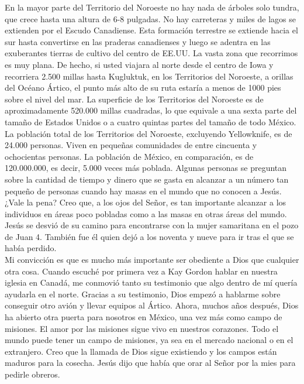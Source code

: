 \documentclass[twoside, 12pt]{book}
\begin{document}
En la mayor parte del Territorio del Noroeste no hay nada de árboles solo tundra, que crece hasta una altura de 6-8 pulgadas. No hay carreteras y miles de lagos se extienden por el Escudo Canadiense. Esta formación terrestre se extiende hacia el sur hasta convertirse en las praderas canadienses y luego se adentra en las exuberantes tierras de cultivo del centro de EE.UU. La vasta zona que recorrimos es muy plana. De hecho, si usted viajara al norte desde el centro de Iowa y recorriera 2.500 millas hasta Kugluktuk, en los Territorios del Noroeste, a orillas del Océano Ártico, el punto más alto de su ruta estaría a menos de 1000 pies sobre el nivel del mar. La superficie de los Territorios del Noroeste es de aproximadamente 520.000 millas cuadradas, lo que equivale a una sexta parte del tamaño de Estados Unidos o a cuatro quintas partes del tamaño de todo México. La población total de los Territorios del Noroeste, excluyendo Yellowknife, es de 24.000 personas. Viven en pequeñas comunidades de entre cincuenta y ochocientas personas. La población de México, en comparación, es de 120.000.000, es decir, 5.000 veces más poblada. Algunas personas se preguntan sobre la cantidad de tiempo y dinero que se gasta en alcanzar a un número tan pequeño de personas cuando hay masas en el mundo que no conocen a Jesús. ¿Vale la pena? Creo que, a los ojos del Señor, es tan importante alcanzar a los individuos en áreas poco pobladas como a las masas en otras áreas del mundo. Jesús se desvió de su camino para encontrarse con la mujer samaritana en el pozo de Juan 4. También fue él quien dejó a los noventa y nueve para ir tras el que se había perdido.\\

Mi convicción es que es mucho más importante ser obediente a Dios que cualquier otra cosa. Cuando escuché por primera vez a Kay Gordon hablar en nuestra iglesia en Canadá, me conmovió tanto su testimonio que algo dentro de mí quería ayudarla en el norte. Gracias a su testimonio, Dios empezó a hablarme sobre conseguir otro avión y llevar equipos al Ártico. Ahora, muchos años después, Dios ha abierto otra puerta para nosotros en México, una vez más como campo de misiones. El amor por las misiones sigue vivo en nuestros corazones. Todo el mundo puede tener un campo de misiones, ya sea en el mercado nacional o en el extranjero. Creo que la llamada de Dios sigue existiendo y los campos están maduros para la cosecha. Jesús dijo que había que orar al Señor por la mies para pedirle obreros.\\
\end{document}
